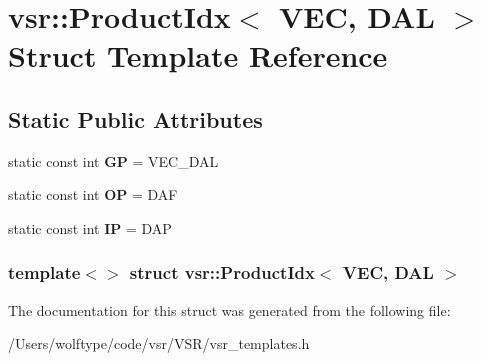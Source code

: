 \hypertarget{structvsr_1_1_product_idx_3_01_v_e_c_00_01_d_a_l_01_4}{\section{vsr\-:\-:Product\-Idx$<$ V\-E\-C, D\-A\-L $>$ Struct Template Reference}
\label{structvsr_1_1_product_idx_3_01_v_e_c_00_01_d_a_l_01_4}
}
\subsection*{Static Public Attributes}
\begin{DoxyCompactItemize}
\item 
\hypertarget{structvsr_1_1_product_idx_3_01_v_e_c_00_01_d_a_l_01_4_a82bae5852590d4b89cb59c952883439a}{static const int {\bfseries G\-P} = V\-E\-C\-\_\-\-D\-A\-L}\label{structvsr_1_1_product_idx_3_01_v_e_c_00_01_d_a_l_01_4_a82bae5852590d4b89cb59c952883439a}

\item 
\hypertarget{structvsr_1_1_product_idx_3_01_v_e_c_00_01_d_a_l_01_4_a97b9c0ba13aa1ef9083928e6f719fdfb}{static const int {\bfseries O\-P} = D\-A\-F}\label{structvsr_1_1_product_idx_3_01_v_e_c_00_01_d_a_l_01_4_a97b9c0ba13aa1ef9083928e6f719fdfb}

\item 
\hypertarget{structvsr_1_1_product_idx_3_01_v_e_c_00_01_d_a_l_01_4_afd2536cea1fb8b13c1f38a854779614d}{static const int {\bfseries I\-P} = D\-A\-P}\label{structvsr_1_1_product_idx_3_01_v_e_c_00_01_d_a_l_01_4_afd2536cea1fb8b13c1f38a854779614d}

\end{DoxyCompactItemize}
\subsubsection*{template$<$$>$ struct vsr\-::\-Product\-Idx$<$ V\-E\-C, D\-A\-L $>$}



The documentation for this struct was generated from the following file\-:\begin{DoxyCompactItemize}
\item 
/\-Users/wolftype/code/vsr/\-V\-S\-R/vsr\-\_\-templates.\-h\end{DoxyCompactItemize}
